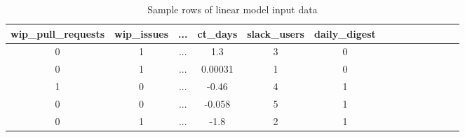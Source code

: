 
\newcommand*\rot{\rotatebox{90}}
\begin{table}[ht]
\begin{center}
\begin{tabular}{|c|c|c|c|c|c|c|c|c|c|c|c|c|c|} 
\hline

wip\_pull\_requests & wip\_issues & ... & ct\_days & slack\_users & daily\_digest \\ [0.5ex]
\hline\hline

0 & 1 & ... & 1.3 & 3 & 0 \\
0 & 1 & ... & 0.00031 & 1 & 0 \\ 
1 & 0 & ... & -0.46 & 4 & 1 \\
0 & 0 & ... & -0.058 & 5 & 1 \\
0 & 1 & ... & -1.8 & 2 & 1 \\

\hline
\end{tabular}
\caption{Sample rows of linear model input data}
\label{tab:dataExample}
\end{center}
\end{table}

